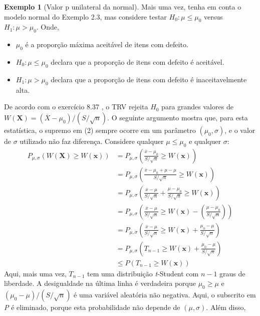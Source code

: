 \documentclass[10pt]{article}
\theoremstyle{plain}
\theoremstyle{remark}
\theoremstyle{definition}
\newtheorem{exe}[teor]{Exemplo}
\begin{document}
\begin{framed}
\begin{exe}[Valor p unilateral da normal]
Mais uma vez, tenha em conta o modelo normal do Exemplo 2.3, mas considere testar $H_{0}:\mu \leq \mu_{0}$ versus $H_{1}: \mu > \mu_{0}$. Onde,
\begin{itemize}
    \item $\mu_0$ é a proporção máxima aceitável de itens com defeito.
    \item $H_{0}:\mu \leq \mu_{0}$ declara que a proporção de itens com defeito é aceitável.
    \item $H_{1}: \mu > \mu_{0}$ declara que a proporção de itens com defeito é inaceitavelmente alta.
\end{itemize}
De acordo com o exercício 8.37 \cite[p.~407]{casella}, o TRV rejeita $H_{0}$ para grandes valores de $W(\textbf{X})=(\overline{X}-\mu_{0})/(S/\sqrt{n})$. O seguinte argumento mostra que, para esta estatística, o supremo em (2) sempre ocorre em um parâmetro $(\mu_{0},\sigma)$, e o valor de $\sigma$ utilizado não faz diferença. Considere qualquer $\mu \leq \mu_{0}$ e qualquer $\sigma$:
\begin{align*}
P_{\mu,\sigma}(W(\textbf{X}) \geq W(\textbf{x})) &=P_{\mu,\sigma}\left(\frac{\overline{x}-\mu_{0}}{S/\sqrt{n}} \geq W(\textbf{x})\right)\\
&=P_{\mu,\sigma}\left(\frac{\overline{x}-\mu_{0} + \mu - \mu}{S/\sqrt{n}} \geq W(\textbf{x})\right)\\
&=P_{\mu,\sigma}\left(\frac{\overline{x}-\mu}{S/\sqrt{n}} + \frac{\mu-\mu_0}{S/\sqrt{n}}\geq W(\textbf{x})\right)\\
&=P_{\mu,\sigma}\left(\frac{\overline{x}-\mu}{S/\sqrt{n}} \geq W(\textbf{x}) - \left( \frac{\mu-\mu_0}{S/\sqrt{n}}\right)\right)\\
&=P_{\mu,\sigma}\left(\frac{\overline{x}-\mu}{S/\sqrt{n}} \geq W(\textbf{x}) + \frac{\mu_{0}-\mu}{S/\sqrt{n}}\right)\\
&=P_{\mu,\sigma}\left(T_{n-1} \geq W(\textbf{x})+\frac{\mu_{0}-\mu}{S/\sqrt{n}}\right)\\
&\leq P(T_{n-1} \geq W(\textbf{x}))
\end{align*}
Aqui, mais uma vez, $T_{n-1}$ tem uma distribuição \textit{t}-Student com $n-1$ graus de liberdade. A desigualdade na última linha é verdadeira porque $\mu_{0} \geq \mu$ e $(\mu_{0}-\mu)/(S/\sqrt{n})$ é uma variável aleatória não negativa. Aqui, o subscrito em \textit{P} é eliminado, porque esta probabilidade não depende de $(\mu,\sigma)$. Além disso,
\begin{center}

\end{center}
\end{exe}
\end{framed}
\end{document}
